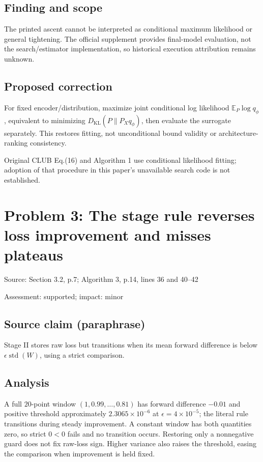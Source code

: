 \documentclass[11pt]{article}
\begin{document}
\subsection*{Finding and scope}

The printed ascent cannot be interpreted as conditional maximum likelihood or general tightening. The official supplement provides final-model evaluation, not the search/estimator implementation, so historical execution attribution remains unknown.

\subsection*{Proposed correction}

For fixed encoder/distribution, maximize joint conditional log likelihood \(\mathbb E_P\log q_\phi\), equivalent to minimizing \(D_{\mathrm{KL}}(P\|P_Xq_\phi)\), then evaluate the surrogate separately. This restores fitting, not unconditional bound validity or architecture-ranking consistency.

Original CLUB Eq.(16) and Algorithm 1 use conditional likelihood fitting; adoption of that procedure in this paper’s unavailable search code is not established.

\section*{Problem 3: The stage rule reverses loss improvement and misses plateaus}

Source: Section 3.2, p.7; Algorithm 3, p.14, lines 36 and 40–42

Assessment: supported; impact: minor

\subsection*{Source claim (paraphrase)}

Stage II stores raw loss but transitions when its mean forward difference is below \(\epsilon\operatorname{std}(W)\), using a strict comparison.

\subsection*{Analysis}

A full \(20\)-point window \((1,0.99,\ldots,0.81)\) has forward difference \(-0.01\) and positive threshold approximately \(2.3065\times10^{-6}\) at \(\epsilon=4\times10^{-5}\); the literal rule transitions during steady improvement. A constant window has both quantities zero, so strict \(0<0\) fails and no transition occurs. Restoring only a nonnegative guard does not fix raw-loss sign. Higher variance also raises the threshold, easing the comparison when improvement is held fixed.
\end{document}
